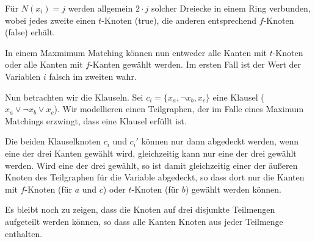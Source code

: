 \documentclass[a4paper]{article}
\begin{document}
Für $N(x_i) = j$ werden allgemein $2 \cdot j$ solcher Dreiecke in einem Ring
verbunden, wobei jedes zweite einen $t$-Knoten (true), die anderen
entsprechend $f$-Knoten (false) erhält.

In einem Maxmimum Matching können nun entweder alle Kanten mit $t$-Knoten
oder alle Kanten mit $f$-Kanten gewählt werden.
Im ersten Fall ist der Wert der Variablen $i$ falsch im zweiten wahr.

Nun betrachten wir die Klauseln.
Sei $c_i = \{x_a, \neg x_b, x_c\}$ eine Klausel ($x_a \vee \neg x_b \vee
x_c$).
Wir modellieren einen Teilgraphen, der im Falle eines Maximum Matchings
erzwingt, dass eine Klausel erfüllt ist.


Die beiden Klauselknoten $c_i$ und $c_i'$ können nur dann abgedeckt werden,
wenn eine der drei Kanten gewählt wird, gleichzeitig kann nur eine der drei
gewählt werden. Wird eine der drei gewählt, so ist damit gleichzeitig einer
der äußeren Knoten des Teilgraphen für die Variable abgedeckt, so dass dort
nur die Kanten mit $f$-Knoten (für $a$ und $c$) oder $t$-Knoten (für $b$)
gewählt werden können.

Es bleibt noch zu zeigen, dass die Knoten auf drei disjunkte Teilmengen
aufgeteilt werden können, so dass alle Kanten Knoten aus jeder Teilmenge
enthalten.
\end{document}
